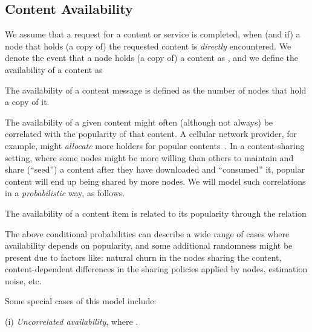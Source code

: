 \documentclass[journal]{IEEEtran}
\begin{document}
\subsection*{\textbf{Content Availability}}
We assume that a request for a content or service is completed, when (and if) a node that holds (a copy of) the requested content is \textit{directly} encountered. We denote the event that a node  holds (a copy of) a content  as , 
and we define the availability  of a content  as
\begin{definition}\label{def:content-avalability}
The availability of a content message  is defined as the number of nodes  that hold a copy of it. 

\end{definition}

The availability of a given content might often (although not always) be correlated with the popularity of that content. A cellular network provider, for example, might \textit{allocate} more holders for popular contents~\cite{multiple-offloading}. In a content-sharing setting, where some nodes might be more willing than others to maintain and share (``seed'') a content after they have downloaded and ``consumed'' it, popular content will end up being shared by more nodes. We will model such correlations in a \textit{probabilistic} way, as follows.
\begin{definition}\label{def:avail-popul-relation-generic}
The availability of a content item is related to its popularity through the relation

\end{definition}
The above conditional probabilities can describe a wide range of cases where availability depends on popularity, and some additional randomness might be present due to factors like: natural churn in the nodes sharing the content, content-dependent differences in the sharing policies applied by nodes, estimation noise, etc.  

Some special cases of this model include: 

(i) \textit{Uncorrelated availability}, where . 
\end{document}
